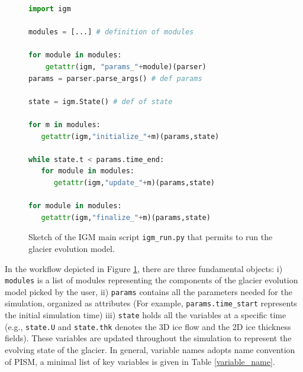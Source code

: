 \documentclass[10pt,twocolumn]{article}
\begin{document}
\begin{figure}[!h]  
\begin{lstlisting}[language=python,numbers=none,framexleftmargin=0pt]
import igm
 
modules = [...] # definition of modules
        
for module in modules:
    getattr(igm, "params_"+module)(parser)        
params = parser.parse_args() # def params

state = igm.State() # def of state

for m in modules:
   getattr(igm,"initialize_"+m)(params,state)

while state.t < params.time_end:
   for module in modules:
      getattr(igm,"update_"+m)(params,state)

for module in modules:
   getattr(igm,"finalize_"+m)(params,state)
\end{lstlisting}
\caption{Sketch of the IGM main script \texttt{igm\_run.py} that permits
to run the glacier evolution model. \label{code-main}}
\end{figure}

In the workflow depicted in Figure \ref{code-main}, there are three fundamental objects:
i) \texttt{modules} is a list of modules representing the components of 
the glacier evolution model picked by the user,
ii) \texttt{params} contains all the parameters needed for the simulation, organized as attributes
(For example, \texttt{params.time\_start} represents the initial simulation time)
iii) \texttt{state} holds all the variables at a specific time 
(e.g., \texttt{state.U} and \texttt{state.thk} denotes the 3D ice flow and the 2D ice thickness fields). 
These variables are updated throughout the simulation to represent the evolving state of the glacier.
In general, variable names adopts name convention of PISM, a minimal list of key variables is given in
Table \ref{variable_name}.
\end{document}
